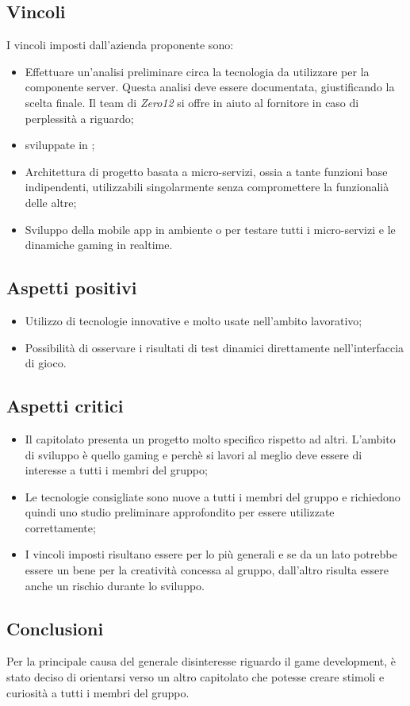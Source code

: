 \subsection{Vincoli}
I vincoli imposti dall'azienda proponente sono:
\begin{itemize}
\item Effettuare un'analisi preliminare circa la tecnologia da utilizzare per la componente server. Questa analisi deve essere documentata, giustificando la scelta finale. Il team di \textit{Zero12} si offre in aiuto al fornitore in caso di perplessità a riguardo;
\item {} sviluppate in ;
\item Architettura di progetto basata a micro-servizi, ossia a tante funzioni base indipendenti, utilizzabili singolarmente senza compromettere la funzionalià delle altre;
\item Sviluppo della mobile app in ambiente  o  per testare tutti i micro-servizi e le dinamiche gaming in realtime. 
\end{itemize}

\subsection{Aspetti positivi}
\begin{itemize}
\item Utilizzo di tecnologie innovative e molto usate nell'ambito lavorativo;
\item Possibilità di osservare i risultati di test dinamici direttamente nell'interfaccia di gioco.
\end{itemize}

\subsection{Aspetti critici}
\begin{itemize}
\item Il capitolato presenta un progetto molto specifico rispetto ad altri. L'ambito di sviluppo è quello gaming e perchè si lavori al meglio deve essere di interesse a tutti i membri del gruppo;
\item Le tecnologie consigliate sono nuove a tutti i membri del gruppo e richiedono quindi uno studio preliminare approfondito per essere utilizzate correttamente;
\item I vincoli imposti risultano essere per lo più generali e se da un lato potrebbe essere un bene per la creatività concessa al gruppo, dall'altro risulta essere anche un rischio durante lo sviluppo. 
\end{itemize}

\subsection{Conclusioni}
Per la principale causa del generale disinteresse riguardo il game development, è stato deciso di orientarsi verso un altro capitolato che potesse creare stimoli e curiosità a tutti i membri del gruppo.
